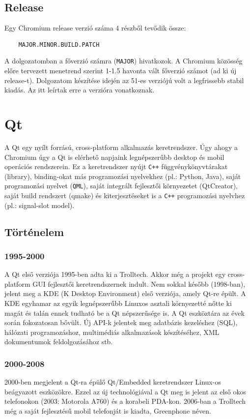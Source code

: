 \documentclass[12pt]{report}
\begin{document}
\subsection{Release}
Egy Chromium release verzió száma 4 részből tevődik össze:
\begin{verbatim}
    MAJOR.MINOR.BUILD.PATCH
\end{verbatim}
A dolgozatomban a főverzió számra (\texttt{MAJOR}) hivatkozok.
A Chromium közösség előre tervezett menetrend szerint 1-1.5 havonta vált főverzió számot
(ad ki új release-t).
Dolgozatom készítése idején az 51-es verziójú volt a legfrissebb stabil kiadás.
Az itt leírtak erre a verzióra vonatkoznak.


\section{Qt}
A Qt egy nyílt forrású, cross-platform alkalmazás keretrendszer. Úgy ahogy a
Chromium úgy a Qt is elérhető napjaink legnépszerűbb desktop és mobil
operációs rendszerein. Ez a keretrendszer nyújt \texttt{C++} függvénykönyvtárakat (library),
binding-okat más programozási nyelvekhez (pl.: Python, Java), saját programozási nyelvet
(\texttt{QML}), saját integrált fejlesztői környezetet (QtCreator), saját build rendszert
(qmake) és kiterjesztéseket is a \texttt{C++} programozási nyelvhez (pl.: signal-slot model).
\cite{bib:qt-wiki-about-qt}

\subsection{Történelem}
\subsubsection{1995-2000}
A Qt első verziója 1995-ben adta ki a Trolltech. Akkor még a projekt egy
cross-platform GUI fejlesztői keretrendszernek indult.
Nem sokkal később (1998-ban), jelent meg a
KDE (K Desktop Environment) első verziója, amely Qt-re épült.
A KDE egyhamar az egyik legnépszerűbb Linuxos asztali környezetté nőtte ki magát
és talán ennek tudható be a Qt népszerűsége is.
A Qt eszköztára az évek során fokozatosan
bővült. Új API-k jelentek meg adatbázis kezeléshez (SQL), hálózati programozáshoz,
multimédiás alkalmazások készítéséhez, XML dokumentumok feldolgozásához stb.

\subsubsection{2000-2008}
2000-ben megjelent a Qt-ra épülő Qt/Embedded keretrendszer Linux-os beágyazott eszközökre.
Ezzel az új technológiával a Qt meg is jelent az első okos telefonokon (2003: Motorola A760)
és a korabeli PDA-kon. 2006-ban a Trolltech még a saját fejlesztésű mobil telefonját is
kiadta, Greenphone néven.
\end{document}
